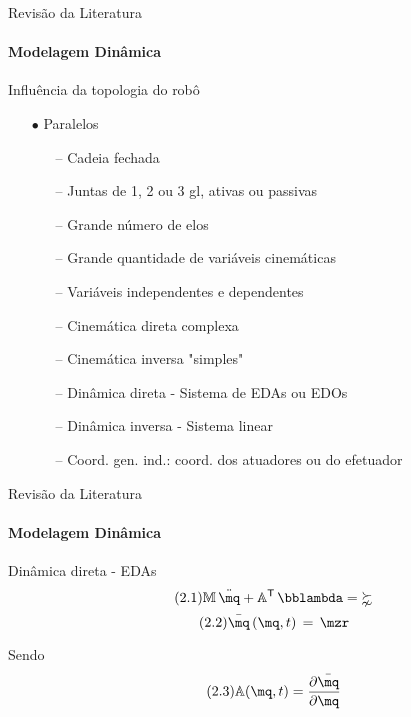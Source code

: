 \documentclass[25pt,landscape]{beamer}
\begin{document}
\begin{frame}{Revisão da Literatura}
    \framesubtitle{Modelagem Dinâmica}
    \begin{block}{Influência da topologia do robô}
    	\begin{itemize}
    		\item[$\bullet$] Paralelos
    		\begin{itemize}
    			\item[--] Cadeia fechada \\[4pt]
    			\item[--] Juntas de 1, 2 ou 3 gl, ativas ou passivas \\[4pt]
    			\item[--] Grande número de elos \\[4pt]
    			\item[--] Grande quantidade de variáveis cinemáticas \\[4pt]
    			\item[--] Variáveis independentes e dependentes \\[4pt]
    			\item[--] Cinemática direta complexa \\[4pt]
    			\item[--] Cinemática inversa "simples" \\[4pt]
    			\item[--] Dinâmica direta - Sistema de EDAs ou EDOs \\[4pt]
    			\item[--] Dinâmica inversa - Sistema linear \\[4pt]
    			\item[--] Coord. gen. ind.: coord. dos atuadores ou do efetuador \\[4pt]
    		\end{itemize}
    	\end{itemize}
    \end{block}
\end{frame}

\begin{frame}{Revisão da Literatura}
    \framesubtitle{Modelagem Dinâmica}
    \begin{block}{Dinâmica direta - EDAs}
		\begin{equation} \label{DAE1} \tag{2.1}
			\mM \, \ddot{\mq} + \mA^\msT \,\mlambda = \meta
		\end{equation}
		\begin{equation} \label{DAE2} \tag{2.2}
			\bar{\mq} \, (\mq,t) \, = \, \mzr
		\end{equation}
	
		Sendo
		\begin{equation} \tag{2.3}
			\mA(\mq,t) = \frac{\partial \bar{\mq}}{\partial \mq}
		\end{equation}
	\end{block}
\end{frame}
\end{document}
